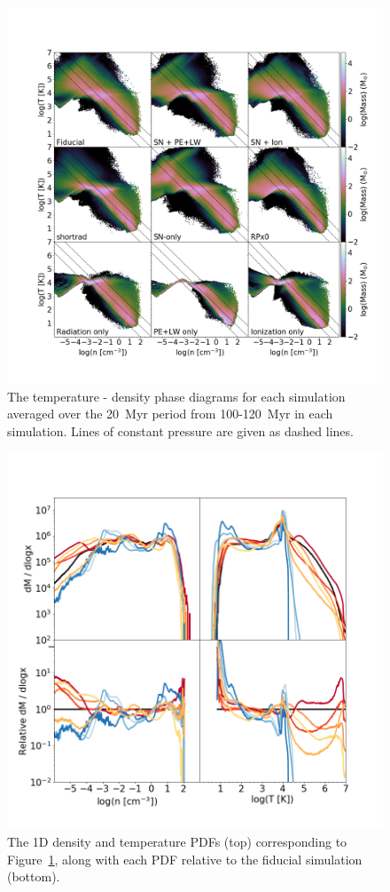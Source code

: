 \documentclass[twocolumn]{aastex62}
\begin{document}
\begin{figure}
  \centering
  \includegraphics[width=0.95\linewidth]{figures/phase_plot_nT_phase_disk}
  \caption{The temperature - density phase diagrams for each simulation averaged over the 20~Myr period from 100-120~Myr in each simulation. Lines of constant pressure are given as dashed lines.}
  \label{fig:phase_diagram}
\end{figure}

\begin{figure}
  \centering
  \includegraphics[width=0.95\linewidth]{figures/1D_phase_plot_2panel_nT_phase_disk}
  \caption{The 1D density and temperature PDFs (top) corresponding to Figure~\ref{fig:phase_diagram}, along with each PDF relative to the fiducial simulation (bottom).}
  \label{fig:1D_phase}
\end{figure}
\end{document}
